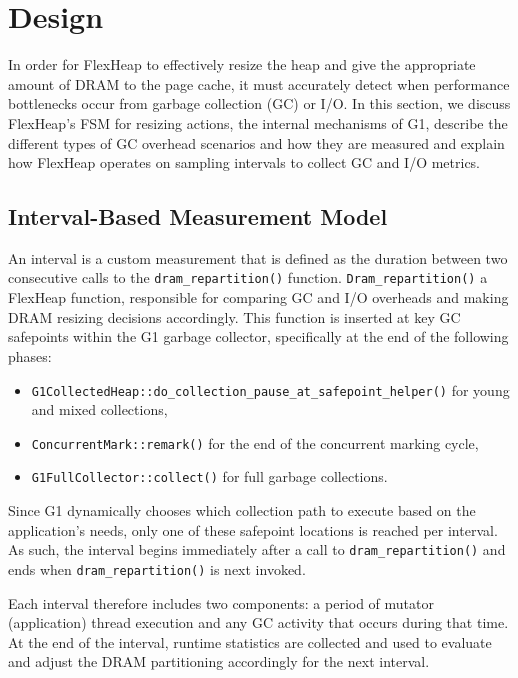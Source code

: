 \section{Design}

In order for FlexHeap to effectively resize 
the heap and give the appropriate amount of DRAM to the page 
cache, it must accurately detect when performance bottlenecks occur
from garbage collection (GC) or I/O. 
In this section, we discuss FlexHeap's FSM for resizing actions, the 
internal mechanisms of G1, describe the different types of GC overhead scenarios and how they 
are measured and explain how FlexHeap operates on sampling intervals to collect GC and I/O metrics.
\subsection{Interval-Based Measurement Model}

An interval is a custom measurement that is defined as the duration between two consecutive calls to the \texttt{dram\_repartition()} function.
\texttt{Dram\_repartition()} a FlexHeap function, responsible for comparing GC and I/O overheads
and making DRAM resizing decisions accordingly. 
This function is inserted at key GC safepoints within the G1 garbage collector, specifically at the end of the following phases: 

\begin{itemize}
  \item \texttt{G1CollectedHeap::do\allowbreak\_collection\allowbreak\_pause\allowbreak\_at\allowbreak\_safepoint\allowbreak\_helper()} for young and mixed collections,
  \item \texttt{ConcurrentMark::remark()} for the end of the concurrent marking cycle,
  \item \texttt{G1FullCollector::collect()} for full garbage collections.
\end{itemize}

Since G1 dynamically chooses which collection path to execute based on the application's needs, only one of these safepoint 
locations is reached per interval. As such, the interval begins immediately after a call to \texttt{dram\_repartition()} 
and ends when \texttt{dram\_repartition()} is next invoked.

Each interval therefore includes two components: a period of mutator (application) thread execution 
and any GC activity that occurs during that time. At the end of the interval, runtime statistics are 
collected and used to evaluate and adjust the 
DRAM partitioning accordingly for the next interval.


